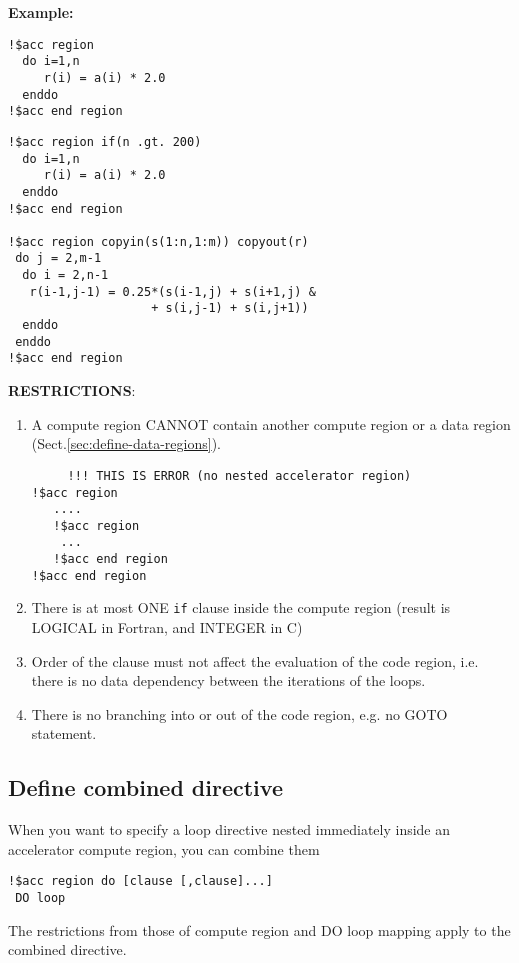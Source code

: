{\bf Example:}
\begin{lstlisting}
!$acc region
  do i=1,n 
     r(i) = a(i) * 2.0
  enddo
!$acc end region
\end{lstlisting}

\begin{lstlisting}
!$acc region if(n .gt. 200)
  do i=1,n 
     r(i) = a(i) * 2.0
  enddo
!$acc end region

!$acc region copyin(s(1:n,1:m)) copyout(r)
 do j = 2,m-1
  do i = 2,n-1
   r(i-1,j-1) = 0.25*(s(i-1,j) + s(i+1,j) & 
                    + s(i,j-1) + s(i,j+1))
  enddo
 enddo
!$acc end region
\end{lstlisting}


{\bf RESTRICTIONS}:
\begin{enumerate}
\item A compute region CANNOT contain another compute region or a
  data region (Sect.\ref{sec:define-data-regions}).
\begin{lstlisting}
     !!! THIS IS ERROR (no nested accelerator region)
!$acc region     
   ....
   !$acc region 
    ...
   !$acc end region
!$acc end region
\end{lstlisting}
\item There is at most ONE \verb!if! clause inside the compute region
  (result is LOGICAL in Fortran, and INTEGER in C)
\item Order of the clause must not affect the evaluation of the code
  region, i.e. there is no data dependency between the iterations of
  the loops. 
\item There is no branching into or out of the code region, e.g. no
  GOTO statement. 
\end{enumerate}

\subsection{Define combined directive}
\label{sec:define-comb-direct}

When you want to specify a loop directive nested immediately inside an
accelerator compute region, you can combine them
\begin{lstlisting}
!$acc region do [clause [,clause]...]
 DO loop
\end{lstlisting}

The restrictions from those of compute region and DO loop mapping
apply to the combined directive. 


